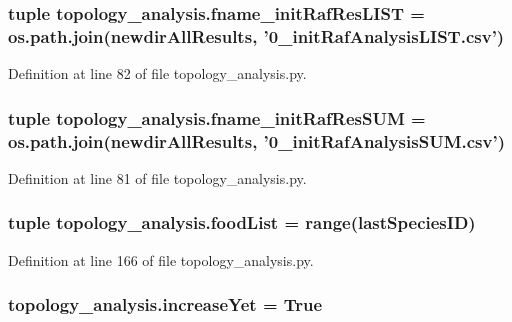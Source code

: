 \hypertarget{a00159_ae1a425430860aba59e0118dbe1ac2163}{
\subsubsection[{fname\+\_\+init\+Raf\+Res\+L\+I\+S\+T}]{\setlength{\rightskip}{0pt plus 5cm}tuple topology\+\_\+analysis.\+fname\+\_\+init\+Raf\+Res\+L\+I\+S\+T = os.\+path.\+join({\bf newdir\+All\+Results}, '0\+\_\+init\+Raf\+Analysis\+L\+I\+S\+T.\+csv')}}\label{a00159_ae1a425430860aba59e0118dbe1ac2163}


Definition at line 82 of file topology\+\_\+analysis.\+py.

\hypertarget{a00159_ac3f3b9f72351b39261d33caf3d22d03e}{
\subsubsection[{fname\+\_\+init\+Raf\+Res\+S\+U\+M}]{\setlength{\rightskip}{0pt plus 5cm}tuple topology\+\_\+analysis.\+fname\+\_\+init\+Raf\+Res\+S\+U\+M = os.\+path.\+join({\bf newdir\+All\+Results}, '0\+\_\+init\+Raf\+Analysis\+S\+U\+M.\+csv')}}\label{a00159_ac3f3b9f72351b39261d33caf3d22d03e}


Definition at line 81 of file topology\+\_\+analysis.\+py.

\hypertarget{a00159_a96850fa3d62df1176a8d7a5b988f4a32}{
\subsubsection[{food\+List}]{\setlength{\rightskip}{0pt plus 5cm}tuple topology\+\_\+analysis.\+food\+List = range({\bf last\+Species\+I\+D})}}\label{a00159_a96850fa3d62df1176a8d7a5b988f4a32}


Definition at line 166 of file topology\+\_\+analysis.\+py.

\hypertarget{a00159_a5a68ea0f110f2fae7b8f03d1ce52d54d}{
\subsubsection[{increase\+Yet}]{\setlength{\rightskip}{0pt plus 5cm}topology\+\_\+analysis.\+increase\+Yet = True}}\label{a00159_a5a68ea0f110f2fae7b8f03d1ce52d54d}


